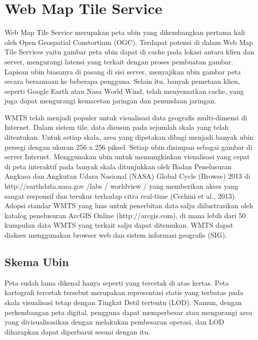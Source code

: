 
\section{Web Map Tile Service}
Web Map Tile Service merupakan peta ubin yang dikembangkan pertama kali oleh Open Geospatial Constortium (OGC). 
Terdapat potensi di dalam Web Map Tile Services yaitu gambar peta ubin dapat di cache pada lokasi antara klien dan server, 
mengurangi latensi yang terkait dengan proses pembuatan gambar. Lapisan ubin biasanya di pasang di sisi server, menyajikan 
ubin gambar peta secara bersamaan ke beberapa pengguna. Selain itu, banyak pemetaan klien, seperti Google Earth atau Nasa 
World Wind, telah menyematkan cache, yang juga dapat mengurangi kemacetan jaringan dan penundaan jaringan. \cite{garcia2012web}

WMTS telah menjadi populer untuk visualisasi data geografis multi-dimensi di Internet. Dalam sistem tile, data disusun pada sejumlah 
skala yang telah ditentukan. Untuk setiap skala, area yang dipetakan dibagi menjadi banyak ubin persegi dengan ukuran 256 x 256 piksel.
Setiap ubin disimpan sebagai gambar di server Internet. Menggunakan ubin untuk memungkinkan visualisasi yang cepat di peta interaktif 
pada banyak skala ditunjukkan oleh Badan Penelusuran Angkasa dan Angkutan Udara Nasional (NASA) Global Cycle (Browse) 2013 di
http://earthdata.nasa.gov /labs / worldview / yang memberikan akses yang sangat responsif dan terukur terhadap citra real-time (Cechini
et al., 2013). Adopsi standar WMTS yang luas untuk penerbitan data salju diilustrasikan oleh katalog penelusuran ArcGIS Online 
(http://arcgis.com), di mana lebih dari 50 kumpulan data WMTS yang terkait salju dapat ditemukan. WMTS dapat diakses menggunakan browser 
web dan sistem informasi geografis (SIG). \cite{Kadlec2016Extracting} 


\subsection{Skema Ubin}
Peta sudah lama dikenal hanya seperti yang tercetak di atas kertas. Peta kartografi tercetak tersebut merupakan representasi 
statis yang terbatas pada skala visualisasi tetap dengan Tingkat Detil tertentu (LOD). Namun, dengan perkembangan peta digital, 
pengguna dapat memperbesar atau mengurangi area yang divisualisasikan dengan melakukan pembesaran operasi, dan LOD diharapkan 
dapat diperbarui sesuai dengan itu. 

